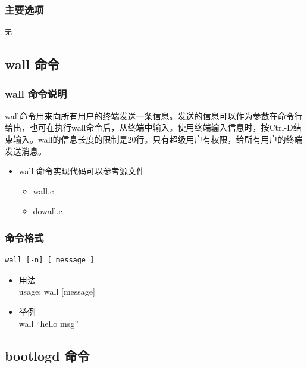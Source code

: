 \subsubsection{主要选项}

{\begin{shaded}\begin{verbatim}
无
\end{verbatim}\end{shaded}}
\subsection{wall 命令}

\subsubsection{wall 命令说明}

wall命令用来向所有用户的终端发送一条信息。发送的信息可以作为参数在命令行给出，也可在执行wall命令后，从终端中输入。使用终端输入信息时，按Ctrl-D结束输入。wall的信息长度的限制是20行。只有超级用户有权限，给所有用户的终端发送消息。

\begin{itemize}
\item
  wall 命令实现代码可以参考源文件
  \begin{itemize}
  \item
    wall.c
  \item
    dowall.c
  \end{itemize}
\end{itemize}
\subsubsection{命令格式}

{\begin{shaded}\begin{verbatim}
wall [-n] [ message ]
\end{verbatim}\end{shaded}}
\begin{itemize}
\item
  用法\\ usage: wall {[}message{]}
\item
  举例\\ wall ``hello msg''
\end{itemize}
\subsection{bootlogd 命令}


